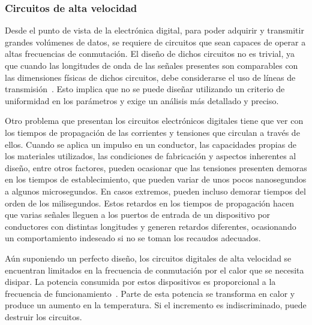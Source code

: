 \subsubsection{Circuitos de alta velocidad}
Desde el punto de vista de la electrónica digital, para poder adquirir y transmitir grandes volúmenes de datos, se requiere de circuitos que sean capaces de operar a altas frecuencias de conmutación. El diseño de dichos circuitos no es trivial, ya que cuando las longitudes de onda de las señales presentes son comparables con las dimensiones físicas de dichos circuitos, debe considerarse el uso de líneas de transmisión~\cite{Ida2015}. Esto implica que no se puede diseñar utilizando un criterio de uniformidad en los parámetros y exige un análisis más detallado y preciso.%

Otro problema que presentan los circuitos electrónicos digitales tiene que ver con los tiempos de propagación de las corrientes y tensiones que circulan a través de ellos. Cuando se aplica un impulso en un conductor, las capacidades propias de los materiales utilizados, las condiciones de fabricación y aspectos inherentes al diseño, entre otros factores, pueden ocasionar que las tensiones presenten demoras en los tiempos de establecimiento, que pueden variar de unos pocos nanosegundos a algunos microsegundos. En casos extremos, pueden incluso demorar tiempos del orden de los milisegundos. Estos retardos en los tiempos de propagación hacen que varias señales lleguen a los puertos de entrada de un dispositivo por conductores con distintas longitudes y generen retardos diferentes, ocasionando un comportamiento indeseado si no se toman los recaudos adecuados.%

Aún suponiendo un perfecto diseño, los circuitos digitales de alta velocidad se encuentran limitados en la frecuencia de conmutación por el calor que se necesita disipar. La potencia consumida por estos dispositivos es proporcional a la frecuencia de funcionamiento~\cite{Wakerly1999}. Parte de esta potencia se transforma en calor y produce un aumento en la temperatura. Si el incremento es indiscriminado, puede destruir los circuitos.%

